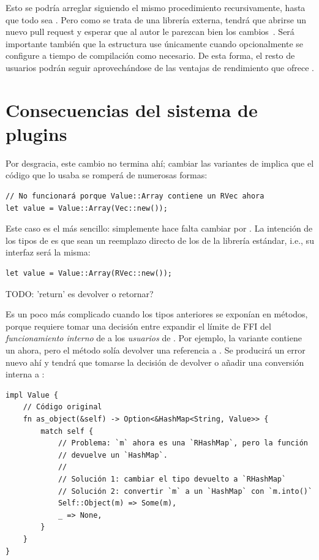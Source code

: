 Esto se podría arreglar siguiendo el mismo procedimiento recursivamente, hasta
que todo sea \rust{#[repr(C)]}. Pero como se trata de una librería externa,
tendrá que abrirse un nuevo pull request y esperar que al autor le parezcan bien
los cambios~\cite{openstaticnode}. Será importante también que la estructura use
\rust{#[repr(C)]} únicamente cuando opcionalmente se configure a tiempo de
compilación como necesario. De esta forma, el resto de usuarios podrán seguir
aprovechándose de las ventajas de rendimiento que ofrece .

\section{Consecuencias del sistema de plugins}

Por desgracia, este cambio no termina ahí; cambiar las variantes de 
implica que el código que lo usaba se romperá de numerosas formas:

\begin{verbatim}
// No funcionará porque Value::Array contiene un RVec ahora
let value = Value::Array(Vec::new());
\end{verbatim}

Este caso es el más sencillo: simplemente hace falta cambiar  por
. La intención de los tipos de \abistable es que sean un reemplazo
directo de los de la librería estándar, i.e., su interfaz será la misma:

\begin{verbatim}
let value = Value::Array(RVec::new());
\end{verbatim}

TODO: 'return' es devolver o retornar?

Es un poco más complicado cuando los tipos anteriores se exponían en métodos,
porque requiere tomar una decisión entre expandir el límite de FFI del
\emph{funcionamiento interno} de  a los \emph{usuarios} de
. Por ejemplo, la variante  contiene un
 ahora, pero el método  solía devolver una
referencia a . Se producirá un error nuevo ahí y tendrá que
tomarse la decisión de devolver  o añadir una conversión interna
a :

\begin{verbatim}
impl Value {
    // Código original
    fn as_object(&self) -> Option<&HashMap<String, Value>> {
        match self {
            // Problema: `m` ahora es una `RHashMap`, pero la función
            // devuelve un `HashMap`.
            //
            // Solución 1: cambiar el tipo devuelto a `RHashMap`
            // Solución 2: convertir `m` a un `HashMap` con `m.into()`
            Self::Object(m) => Some(m),
            _ => None,
        }
    }
}
\end{verbatim}

